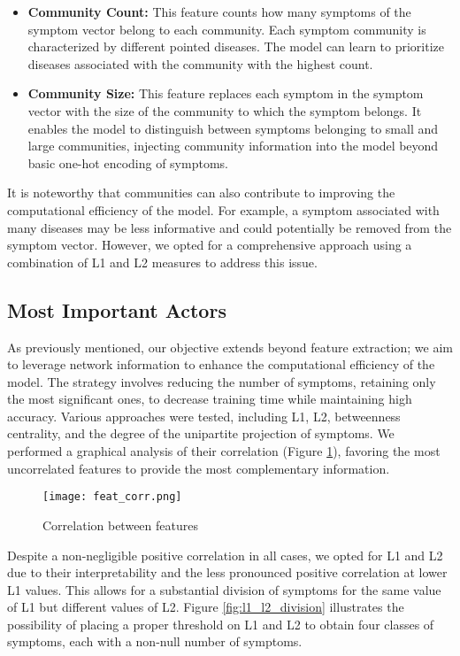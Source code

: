 \begin{itemize}
    \setlength\itemsep{1em} %

    \item \textbf{Community Count:} This feature counts how many symptoms of the symptom vector belong to each community.
          Each symptom community is characterized by different pointed diseases. The model can learn to prioritize
          diseases associated with the community with the highest count.

    \item \textbf{Community Size:} This feature replaces each symptom in the symptom vector with the size of the
          community to which the symptom belongs. It enables the model to distinguish between symptoms belonging to small and
          large communities, injecting community information into the model beyond basic one-hot encoding of symptoms.
\end{itemize}
\noindent
\vspace{0.4cm}
It is noteworthy that communities can also contribute to improving the computational efficiency of the model.
For example, a symptom associated with many diseases may be less informative and could potentially be removed from the
symptom vector. However, we opted for a comprehensive approach using a combination of L1 and L2 measures to address this issue.


\subsection{Most Important Actors}
\label{subsec:most_important_actors}

As previously mentioned, our objective extends beyond feature extraction; we aim to leverage network information to
enhance the computational efficiency of the model. The strategy involves reducing the number of symptoms,
retaining only the most significant ones, to decrease training time while maintaining high accuracy.
Various approaches were tested, including L1, L2, betweenness centrality, and the degree of the unipartite projection
of symptoms. We performed a graphical analysis of their correlation (Figure \ref{fig:feat_corr}), favoring the
most uncorrelated features to provide the most complementary information.

\begin{figure}[H]
    \centering
    \texttt{[image: feat\_corr.png]}
    \caption{Correlation between features}
    \label{fig:feat_corr}
\end{figure}
\noindent
Despite a non-negligible positive correlation in all cases, we opted for L1 and L2 due to their interpretability and
the less pronounced positive correlation at lower L1 values. This allows for a substantial division of symptoms for
the same value of L1 but different values of L2. Figure \ref{fig:l1_l2_division} illustrates the possibility of
placing a proper threshold on L1 and L2 to obtain four classes of symptoms, each with a non-null number of symptoms.

